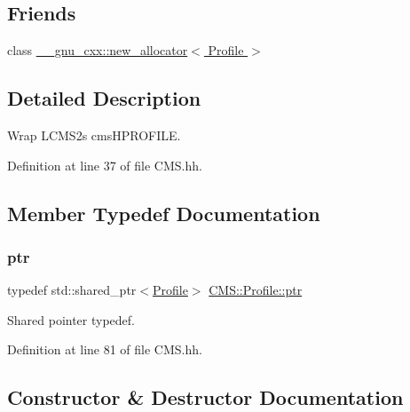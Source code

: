 \subsection*{Friends}
\begin{DoxyCompactItemize}
\item 
class \hyperlink{class_c_m_s_1_1_profile_acc1c1bb221523de35625f0057bffe1fd}{\+\_\+\+\_\+gnu\+\_\+cxx\+::new\+\_\+allocator$<$ Profile $>$}
\end{DoxyCompactItemize}


\subsection{Detailed Description}
Wrap L\+C\+M\+S2\textquotesingle{}s cms\+H\+P\+R\+O\+F\+I\+LE. 

Definition at line 37 of file C\+M\+S.\+hh.



\subsection{Member Typedef Documentation}
\mbox{\label{class_c_m_s_1_1_profile_a7d5a80e1317d17dbfdf5ae69820ab08b}} 
\subsubsection{\texorpdfstring{ptr}{ptr}}
{\footnotesize\ttfamily typedef std\+::shared\+\_\+ptr$<$\hyperlink{class_c_m_s_1_1_profile}{Profile}$>$ \hyperlink{class_c_m_s_1_1_profile_a7d5a80e1317d17dbfdf5ae69820ab08b}{C\+M\+S\+::\+Profile\+::ptr}}



Shared pointer typedef. 



Definition at line 81 of file C\+M\+S.\+hh.



\subsection{Constructor \& Destructor Documentation}
\mbox{\label{class_c_m_s_1_1_profile_a899c56378a13a7f5920f71d88aba7772}} 
